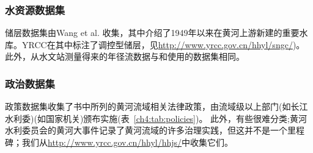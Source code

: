 \subsubsection{水资源数据集}
储层数据集由Wang et al. \cite{wang2019c}收集，其中介绍了1949年以来在黄河上游新建的重要水库。YRCC在其中标注了调控型储层，见\url{http://www.yrcc.gov.cn/hhyl/sngc/})。此外，从水文站测量得来的年径流数据与\cite{wang2019c}和\cite{wang2016e}使用的数据集相同。

\subsubsection{政治数据集}

政策数据集收集了\cite{shuilibuhuangheshuiliweiyuanhui}书中所列的黄河流域相关法律政策，由流域级以上部门(如长江水利委)(如国家机关)颁布实施(表~\ref{ch4:tab:policies})。
此外，有些很难分类;黄河水利委员会的黄河大事件记录了黄河流域的许多治理实践，但这并不是一个里程碑；我们从\url{http://www.yrcc.gov.cn/hhyl/hhjs/}中收集它们。


